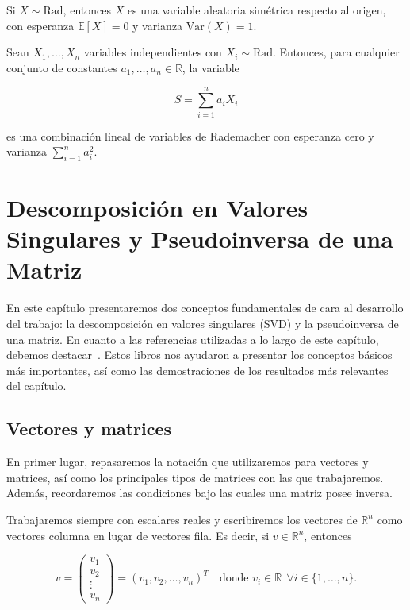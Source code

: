 \begin{proposicion}
    Si $X \sim \text{Rad}$, entonces $X$ es una variable aleatoria simétrica respecto al origen, con esperanza $\mathbb{E}[X] = 0$ y varianza $\text{Var}(X) = 1$.
\end{proposicion}

\begin{proposicion}
    Sean $X_1, \dots, X_n$ variables independientes con $X_i \sim \text{Rad}$. Entonces, para cualquier conjunto de constantes $a_1, \dots, a_n \in \mathbb{R}$, la variable

    \[
        S = \sum_{i=1}^n a_i X_i
    \]

    es una combinación lineal de variables de Rademacher con esperanza cero y varianza $\sum_{i=1}^n a_i^2$.
\end{proposicion}


\chapter{Descomposición en Valores Singulares y Pseudoinversa de una Matriz}\label{ch:descomposicion-valores-singulares-pseudoinversa}

En este capítulo presentaremos dos conceptos fundamentales de cara al desarrollo del trabajo: la descomposición en valores singulares (SVD) y la pseudoinversa de una matriz. En cuanto a las referencias utilizadas a lo largo de este capítulo, debemos destacar~\cite{Friedberg2014linear, Strang2023, Poole2011}. Estos libros nos ayudaron a presentar los conceptos básicos más importantes, así como las demostraciones de los resultados más relevantes del capítulo.

\section{Vectores y matrices}\label{sec:vectores-matrices}

En primer lugar, repasaremos la notación que utilizaremos para vectores y matrices, así como los principales tipos de matrices con las que trabajaremos. Además, recordaremos las condiciones bajo las cuales una matriz posee inversa.

Trabajaremos siempre con escalares reales y escribiremos los vectores de $\mathbb{R}^{n}$ como vectores columna en lugar de vectores fila. Es decir, si $v \in \mathbb{R}^{n}$, entonces

\[ 
    v = \begin{pmatrix} 
        v_{1} \\ 
        v_{2} \\ 
        \vdots \\
        v_{n}
    \end{pmatrix} = {(v_{1}, v_{2}, \ldots, v_{n})}^{T} \quad \text{donde } v_i \in \mathbb{R} \ \ \forall i \in \{1, \ldots, n \}.
\]

